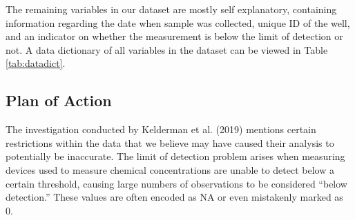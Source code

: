 \documentclass[12pt, twoside]{amherstthesis}
\begin{document}
The remaining variables in our dataset are mostly self explanatory, containing information regarding the date when sample was collected, unique ID of the well, and an indicator on whether the measurement is below the limit of detection or not. A data dictionary of all variables in the dataset can be viewed in Table \ref{tab:datadict}.
\begin{table}

\caption{\label{tab:datadict}Data dictionary for the coal dataset.}
\centering
{}
\end{table}
\hypertarget{plan-of-action}{%
\subsection{Plan of Action}\label{plan-of-action}}

The investigation conducted by Kelderman et al. (2019) mentions certain restrictions within the data that we believe may have caused their analysis to potentially be inaccurate. The limit of detection problem arises when measuring devices used to measure chemical concentrations are unable to detect below a certain threshold, causing large numbers of observations to be considered ``below detection.'' These values are often encoded as NA or even mistakenly marked as 0.
\end{document}
